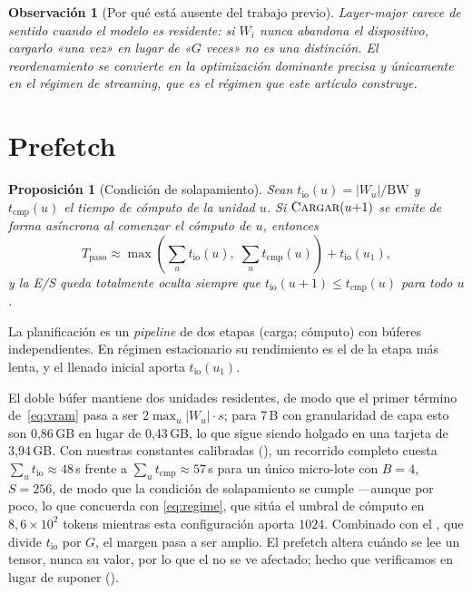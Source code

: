 \documentclass[journal]{IEEEtran}
\newtheorem{proposition}[theorem]{Proposición}
\newtheorem{remark}[theorem]{Observación}
\newcommand{\Wu}{\lvert W_u \rvert}
\begin{document}
\begin{remark}[Por qué está ausente del trabajo previo]
Layer-major carece de sentido cuando el modelo es residente: si $W_i$ nunca abandona el
dispositivo, cargarlo «una vez» en lugar de «$G$ veces» no es una distinción. El reordenamiento se
convierte en la optimización dominante precisa y únicamente en el régimen de streaming, que es el
régimen que este artículo construye.
\end{remark}

\section{Prefetch}
\label{sec:prefetch}

\begin{proposition}[Condición de solapamiento]
\label{prop:prefetch}
Sean $t_{\text{io}}(u) = \Wu / \mathrm{BW}$ y $t_{\text{cmp}}(u)$ el tiempo de cómputo de la unidad
$u$. Si $\textsc{Cargar}(u{+}1)$ se emite de forma asíncrona al comenzar el cómputo de $u$,
entonces
\begin{equation}
T_{\text{paso}} \approx \max\!\left(\textstyle\sum_u t_{\text{io}}(u),\; \sum_u t_{\text{cmp}}(u)\right)
+ t_{\text{io}}(u_1),
\end{equation}
y la E/S queda totalmente oculta siempre que $t_{\text{io}}(u{+}1) \le t_{\text{cmp}}(u)$ para todo
$u$.
\end{proposition}

\begin{IEEEproof}
La planificación es un \emph{pipeline} de dos etapas (carga; cómputo) con búferes
independientes. En régimen
estacionario su rendimiento es el de la etapa más lenta, y el llenado inicial aporta
$t_{\text{io}}(u_1)$.
\end{IEEEproof}

El doble búfer mantiene dos unidades residentes, de modo que el primer término
de~\eqref{eq:vram} pasa a ser $2\max_u \Wu \cdot s$; para 7\,B con granularidad de capa esto son
0,86\,GB en lugar de 0,43\,GB, lo que sigue siendo holgado en una tarjeta de 3,94\,GB. Con nuestras
constantes calibradas (), un recorrido completo cuesta
$\sum_u t_{\text{io}} \approx 48$\,s frente a $\sum_u t_{\text{cmp}} \approx 57$\,s para un único
micro-lote con $B{=}4$, $S{=}256$, de modo que la condición de solapamiento se cumple ---aunque
por poco, lo que concuerda con \eqref{eq:regime}, que sitúa el umbral de cómputo en
$8{,}6\times10^{2}$ tokens mientras esta configuración aporta $1024$. Combinado con el
, que divide $t_{\text{io}}$ por $G$, el margen pasa a ser amplio. El
prefetch altera cuándo se lee un tensor, nunca su valor, por lo que el  no se ve
afectado; hecho que verificamos en lugar de suponer ().
\end{document}
